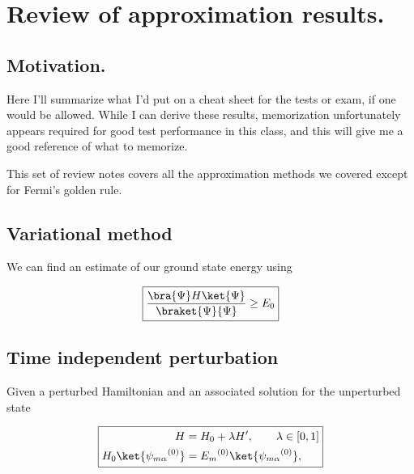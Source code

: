 
%

\chapter{Review of approximation results.}
\label{chap:qmTwoReview}
{}
\date{Nov 6, 2011}

\beginArtWithToc

\section{Motivation.}

Here I'll summarize what I'd put on a cheat sheet for the tests or exam, if one would be allowed.  While I can derive these results, memorization unfortunately appears required for good test performance in this class, and this will give me a good reference of what to memorize.

This set of review notes covers all the approximation methods we covered except for Fermi's golden rule.

\section{Variational method}

We can find an estimate of our ground state energy using

\begin{equation}\label{eqn:qmTwoReview:310}
\boxed{
\frac{
\bra{\Psi} H \ket{\Psi}
}{
\braket{\Psi}{\Psi}
}
\ge E_0
}
\end{equation}

\section{Time independent perturbation}

Given a perturbed Hamiltonian and an associated solution for the unperturbed state

\begin{equation}\label{eqn:qmTwoReview:330}
\boxed{
\begin{aligned}
H &= H_0 + \lambda H', \qquad \lambda \in [0,1] \\
H_0 \ket{{\psi_{m\alpha}}^{(0)}} &= {E_m}^{(0)} \ket{{\psi_{m\alpha}}^{(0)}},
\end{aligned}
}
\end{equation}

